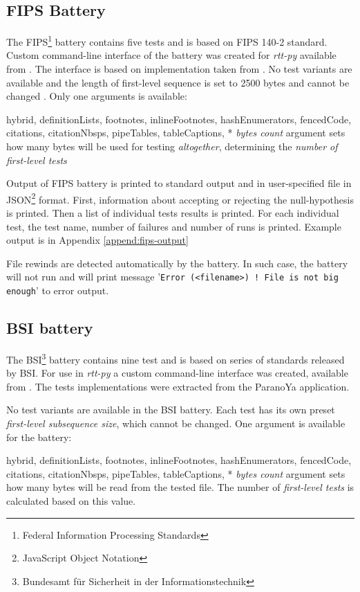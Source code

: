 \documentclass[
  digital,     %
  oneside,     %
  nosansbold,  %
  nocolorbold, %
  nolof,         %
  nolot,         %
]{fithesis4}
\begin{document}
\subsection{FIPS Battery} \label{chap:sols-fips}
The FIPS\footnote{Federal Information Processing Standards} battery contains five tests and is based on FIPS 140-2 standard. Custom command-line interface of the battery was created for \emph{rtt-py} available from \cite{rtt-py-batteries}. The interface is based on implementation taken from \cite{fips-site}. No test variants are available and the length of first-level sequence is set to 2500 bytes and cannot be changed \cite[p. 20]{vavercak}. Only one arguments is available:
\begin{markdown*}{%
  hybrid,
  definitionLists,
  footnotes,
  inlineFootnotes,
  hashEnumerators,
  fencedCode,
  citations,
  citationNbsps,
  pipeTables,
  tableCaptions,
}
* \emph{bytes count} argument sets how many bytes will be used for testing \emph{altogether}, determining the \emph{number of first-level tests} %
\end{markdown*}

Output of FIPS battery is printed to standard output and in user-specified file in JSON\footnote{JavaScript Object Notation} format. First, information about accepting or rejecting the null-hypothesis is printed. Then a list of individual tests results is printed. For each individual test, the test name, number of failures and number of runs is printed. Example output is in Appendix \ref{append:fips-output}

File rewinds are detected automatically by the battery. In such case, the battery will not run and will print message '\texttt{Error (<filename>) ! File is not big enough}' to error output.

\subsection{BSI battery} \label{chap:sols-bsi}
The BSI\footnote{Bundesamt für Sicherheit in der Informationstechnik} battery contains nine test and is based on series of standards released by BSI. \cite[p. 3]{vavercak} For use in \emph{rtt-py} a custom command-line interface was created, available from \cite{rtt-py-batteries}. The tests implementations were extracted from the ParanoYa application. \cite[p. 16]{vavercak}

No test variants are available in the BSI battery. Each test has its own preset \emph{first-level subsequence size}, which cannot be changed. One argument is available for the battery:
\begin{markdown*}{%
  hybrid,
  definitionLists,
  footnotes,
  inlineFootnotes,
  hashEnumerators,
  fencedCode,
  citations,
  citationNbsps,
  pipeTables,
  tableCaptions,
}
* \emph{bytes count} argument sets how many bytes will be read from the tested file. The number of \emph{first-level tests} is calculated based on this value.
\end{markdown*}
\end{document}
